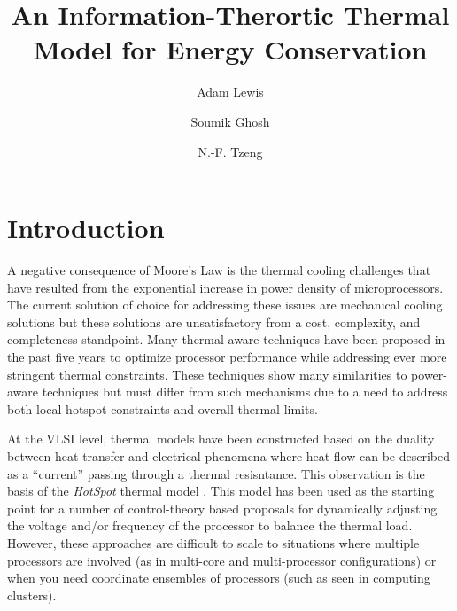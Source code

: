 \documentclass[times, 10pt,onecolumn]{article}
\begin{document}
\title{An Information-Therortic Thermal Model for Energy Conservation}
\author[*]{Adam Lewis} 
\author[*]{Soumik Ghosh} 
\author[*]{N.-F. Tzeng}
\maketitle
\newtheorem{defn}{Definition}
\newtheorem{thm}{Theorem}
\thispagestyle{empty}

\begin{abstract}
  
\end{abstract}
\doublespacing
\section{Introduction}
\label{sec:Introduction}
A negative consequence of Moore's Law is the thermal cooling challenges that
have resulted from the exponential increase in power density of
microprocessors.  The current solution of choice for addressing these issues
are mechanical cooling solutions but these solutions are unsatisfactory from a
cost, complexity, and completeness standpoint. Many thermal-aware techniques
have been proposed in the past five years to optimize processor performance
while addressing ever more stringent thermal constraints.  These techniques
show many similarities to power-aware techniques \cite{Donald2006} but must
differ from such mechanisms due to a need to address both local hotspot
constraints and overall thermal limits.

At the VLSI level, thermal models have been constructed based on the duality
between heat transfer and electrical phenomena where heat flow can be
described as a ``current'' passing through a thermal resisntance.  This
observation is the basis of the \textit{HotSpot} thermal model
\cite{Skadron2004}.  This model has been used as the starting point for a
number of control-theory based proposals for dynamically adjusting the voltage
and/or frequency of the processor to balance the thermal load.  However, these
approaches are difficult to scale to situations where multiple processors are
involved (as in multi-core and multi-processor configurations) or when you
need coordinate ensembles of processors (such as seen in computing clusters).
\end{document}
